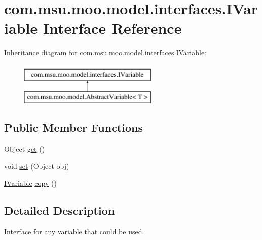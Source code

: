 \hypertarget{interfacecom_1_1msu_1_1moo_1_1model_1_1interfaces_1_1IVariable}{\section{com.\-msu.\-moo.\-model.\-interfaces.\-I\-Variable Interface Reference}
\label{interfacecom_1_1msu_1_1moo_1_1model_1_1interfaces_1_1IVariable}
}
Inheritance diagram for com.\-msu.\-moo.\-model.\-interfaces.\-I\-Variable\-:\begin{figure}[H]
\begin{center}
\leavevmode
\includegraphics[height=2.000000cm]{interfacecom_1_1msu_1_1moo_1_1model_1_1interfaces_1_1IVariable}
\end{center}
\end{figure}
\subsection*{Public Member Functions}
\begin{DoxyCompactItemize}
\item 
Object \hyperlink{interfacecom_1_1msu_1_1moo_1_1model_1_1interfaces_1_1IVariable_a5d91fb013a9135144d975aa05b5f1b29}{get} ()
\item 
void \hyperlink{interfacecom_1_1msu_1_1moo_1_1model_1_1interfaces_1_1IVariable_a3bc30a747b2ee3c161fa3f6af8a9a061}{set} (Object obj)
\item 
\hyperlink{interfacecom_1_1msu_1_1moo_1_1model_1_1interfaces_1_1IVariable}{I\-Variable} \hyperlink{interfacecom_1_1msu_1_1moo_1_1model_1_1interfaces_1_1IVariable_aca748275c7293a63283ada1a665c6c28}{copy} ()
\end{DoxyCompactItemize}


\subsection{Detailed Description}
Interface for any variable that could be used. 

